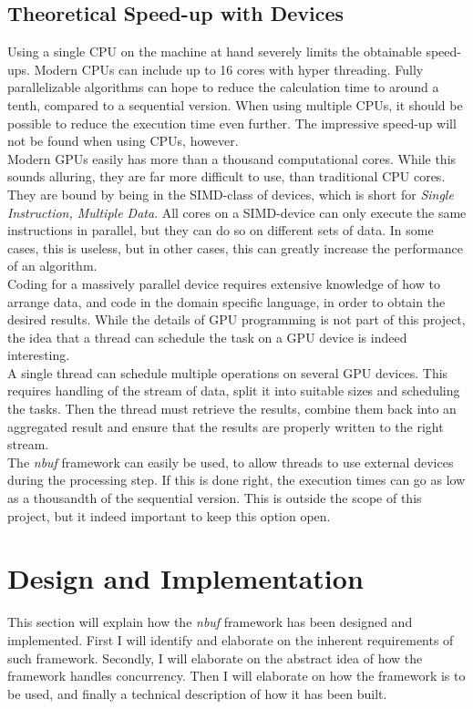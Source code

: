 \documentclass[a4paper]{article}
\newcommand{\nbuf}{\textit{nbuf} }
\begin{document}
\subsection{Theoretical Speed-up with Devices}
Using a single CPU on the machine at hand severely limits the obtainable speed-ups. Modern CPUs can include up to 16 cores with hyper threading. Fully parallelizable algorithms can hope to reduce the calculation time to around a tenth, compared to a sequential version. When using multiple CPUs, it should be possible to reduce the execution time even further. The impressive speed-up will not be found when using CPUs, however.\\

Modern GPUs easily has more than a thousand computational cores. While this sounds alluring, they are far more difficult to use, than traditional CPU cores. They are bound by being in the SIMD-class of devices, which is short for \textit{Single Instruction, Multiple Data}. All cores on a SIMD-device can only execute the same instructions in parallel, but they can do so on different sets of data. In some cases, this is useless, but in other cases, this can greatly increase the performance of an algorithm.\\

Coding for a massively parallel device requires extensive knowledge of how to arrange data, and code in the domain specific language, in order to obtain the desired results. While the details of GPU programming is not part of this project, the idea that a thread can schedule the task on a GPU device is indeed interesting.\\

A single thread can schedule multiple operations on several GPU devices. This requires handling of the stream of data, split it into suitable sizes and scheduling the tasks. Then the thread must retrieve the results, combine them back into an aggregated result and ensure that the results are properly written to the right stream.\\

The \nbuf framework can easily be used, to allow threads to use external devices during the processing step. If this is done right, the execution times can go as low as a thousandth of the sequential version. This is outside the scope of this project, but it indeed important to keep this option open.





\newpage
\section{Design and Implementation}
This section will explain how the \nbuf framework has been designed and implemented. First I will identify and elaborate on the inherent requirements of such framework. Secondly, I will elaborate on the abstract idea of how the framework handles concurrency. Then I will elaborate on how the framework is to be used, and finally a technical description of how it has been built.
\end{document}
